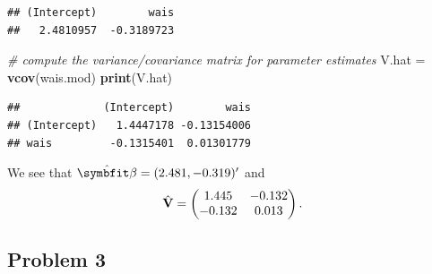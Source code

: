 \documentclass[
  11pt,
]{article}
\newenvironment{Shaded}{\begin{snugshade}}{\end{snugshade}}
\newcommand{\AttributeTok}[1]{\textcolor[rgb]{0.13,0.29,0.53}{#1}}
\newcommand{\CommentTok}[1]{\textcolor[rgb]{0.56,0.35,0.01}{\textit{#1}}}
\newcommand{\DecValTok}[1]{\textcolor[rgb]{0.00,0.00,0.81}{#1}}
\newcommand{\FunctionTok}[1]{\textcolor[rgb]{0.13,0.29,0.53}{\textbf{#1}}}
\newcommand{\NormalTok}[1]{#1}
\newcommand{\OtherTok}[1]{\textcolor[rgb]{0.56,0.35,0.01}{#1}}
\newcommand{\SpecialCharTok}[1]{\textcolor[rgb]{0.81,0.36,0.00}{\textbf{#1}}}
\begin{document}

\begin{Shaded}
\end{Shaded}

\begin{verbatim}
## (Intercept)        wais 
##   2.4810957  -0.3189723
\end{verbatim}

\begin{Shaded}
\begin{Highlighting}[]
\CommentTok{\# compute the variance/covariance matrix for parameter estimates}
\NormalTok{V.hat }\OtherTok{=} \FunctionTok{vcov}\NormalTok{(wais.mod)}
\FunctionTok{print}\NormalTok{(V.hat)}
\end{Highlighting}
\end{Shaded}

\begin{verbatim}
##             (Intercept)        wais
## (Intercept)   1.4447178 -0.13154006
## wais         -0.1315401  0.01301779
\end{verbatim}

We see that \(\hat{\v{\beta}} = (2.481, -0.319)'\) and \[
  \hat{\mathbf{V}} =
  \begin{pmatrix}
    1.445 & -0.132\\
    -0.132 & 0.013
  \end{pmatrix}.
\]

\hypertarget{problem-3}{%
\subsection{Problem 3}\label{problem-3}}
\end{document}
